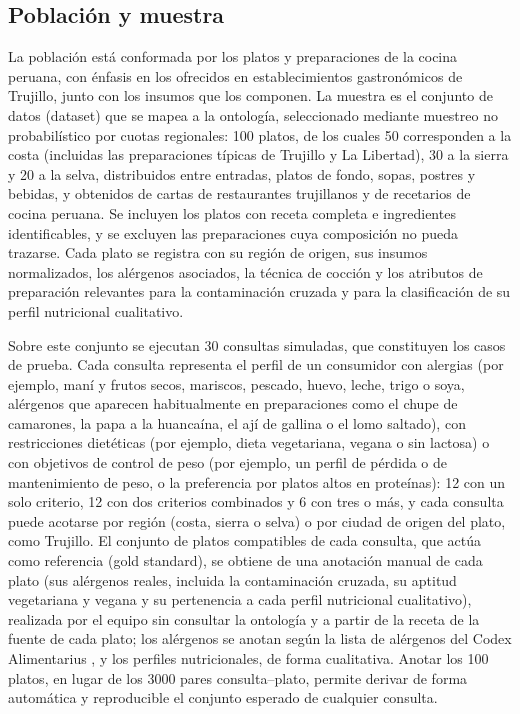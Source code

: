 \documentclass[conference]{IEEEtran}
\begin{document}
\subsection{Población y muestra}
La población está conformada por los platos y preparaciones de la cocina peruana, con énfasis en los ofrecidos en establecimientos gastronómicos de Trujillo, junto con los insumos que los componen. La muestra es el conjunto de datos (dataset) que se mapea a la ontología, seleccionado mediante muestreo no probabilístico por cuotas regionales: 100 platos, de los cuales 50 corresponden a la costa (incluidas las preparaciones típicas de Trujillo y La Libertad), 30 a la sierra y 20 a la selva, distribuidos entre entradas, platos de fondo, sopas, postres y bebidas, y obtenidos de cartas de restaurantes trujillanos y de recetarios de cocina peruana. Se incluyen los platos con receta completa e ingredientes identificables, y se excluyen las preparaciones cuya composición no pueda trazarse. Cada plato se registra con su región de origen, sus insumos normalizados, los alérgenos asociados, la técnica de cocción y los atributos de preparación relevantes para la contaminación cruzada y para la clasificación de su perfil nutricional cualitativo.

Sobre este conjunto se ejecutan 30 consultas simuladas, que constituyen los casos de prueba. Cada consulta representa el perfil de un consumidor con alergias (por ejemplo, maní y frutos secos, mariscos, pescado, huevo, leche, trigo o soya, alérgenos que aparecen habitualmente en preparaciones como el chupe de camarones, la papa a la huancaína, el ají de gallina o el lomo saltado), con restricciones dietéticas (por ejemplo, dieta vegetariana, vegana o sin lactosa) o con objetivos de control de peso (por ejemplo, un perfil de pérdida o de mantenimiento de peso, o la preferencia por platos altos en proteínas): 12 con un solo criterio, 12 con dos criterios combinados y 6 con tres o más, y cada consulta puede acotarse por región (costa, sierra o selva) o por ciudad de origen del plato, como Trujillo. El conjunto de platos compatibles de cada consulta, que actúa como referencia (gold standard), se obtiene de una anotación manual de cada plato (sus alérgenos reales, incluida la contaminación cruzada, su aptitud vegetariana y vegana y su pertenencia a cada perfil nutricional cualitativo), realizada por el equipo sin consultar la ontología y a partir de la receta de la fuente de cada plato; los alérgenos se anotan según la lista de alérgenos del Codex Alimentarius \cite{codex2024}, y los perfiles nutricionales, de forma cualitativa. Anotar los 100 platos, en lugar de los 3000 pares consulta--plato, permite derivar de forma automática y reproducible el conjunto esperado de cualquier consulta.
\end{document}
